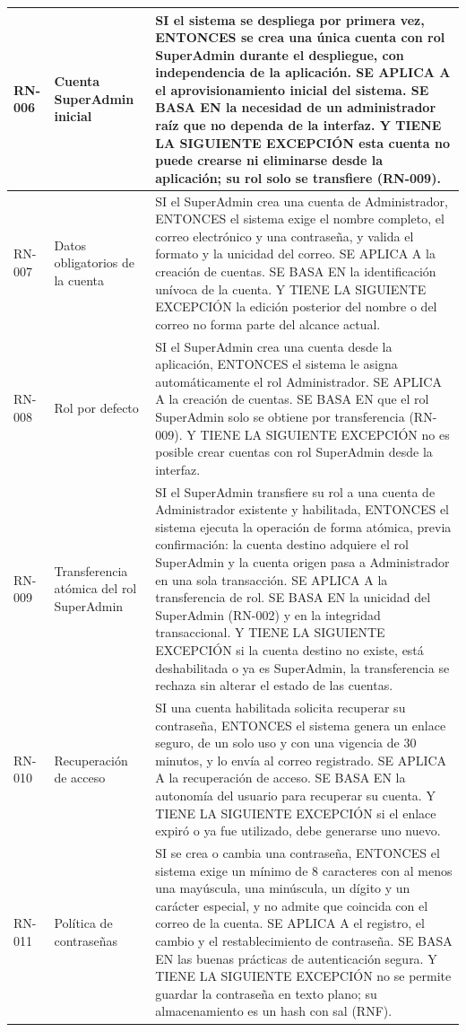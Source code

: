 \begin{longtable}{|C{1.4cm}|L{4.0cm}|L{9.4cm}|}
\hline
RN-006 & Cuenta SuperAdmin inicial & SI el sistema se despliega por primera vez, ENTONCES se crea una única cuenta con rol SuperAdmin durante el despliegue, con independencia de la aplicación. SE APLICA A el aprovisionamiento inicial del sistema. SE BASA EN la necesidad de un administrador raíz que no dependa de la interfaz. Y TIENE LA SIGUIENTE EXCEPCIÓN esta cuenta no puede crearse ni eliminarse desde la aplicación; su rol solo se transfiere (RN-009). \\
\hline
RN-007 & Datos obligatorios de la cuenta & SI el SuperAdmin crea una cuenta de Administrador, ENTONCES el sistema exige el nombre completo, el correo electrónico y una contraseña, y valida el formato y la unicidad del correo. SE APLICA A la creación de cuentas. SE BASA EN la identificación unívoca de la cuenta. Y TIENE LA SIGUIENTE EXCEPCIÓN la edición posterior del nombre o del correo no forma parte del alcance actual. \\
\hline
RN-008 & Rol por defecto & SI el SuperAdmin crea una cuenta desde la aplicación, ENTONCES el sistema le asigna automáticamente el rol Administrador. SE APLICA A la creación de cuentas. SE BASA EN que el rol SuperAdmin solo se obtiene por transferencia (RN-009). Y TIENE LA SIGUIENTE EXCEPCIÓN no es posible crear cuentas con rol SuperAdmin desde la interfaz. \\
\hline
RN-009 & Transferencia atómica del rol SuperAdmin & SI el SuperAdmin transfiere su rol a una cuenta de Administrador existente y habilitada, ENTONCES el sistema ejecuta la operación de forma atómica, previa confirmación: la cuenta destino adquiere el rol SuperAdmin y la cuenta origen pasa a Administrador en una sola transacción. SE APLICA A la transferencia de rol. SE BASA EN la unicidad del SuperAdmin (RN-002) y en la integridad transaccional. Y TIENE LA SIGUIENTE EXCEPCIÓN si la cuenta destino no existe, está deshabilitada o ya es SuperAdmin, la transferencia se rechaza sin alterar el estado de las cuentas. \\
\hline
RN-010 & Recuperación de acceso & SI una cuenta habilitada solicita recuperar su contraseña, ENTONCES el sistema genera un enlace seguro, de un solo uso y con una vigencia de 30 minutos, y lo envía al correo registrado. SE APLICA A la recuperación de acceso. SE BASA EN la autonomía del usuario para recuperar su cuenta. Y TIENE LA SIGUIENTE EXCEPCIÓN si el enlace expiró o ya fue utilizado, debe generarse uno nuevo. \\
\hline
RN-011 & Política de contraseñas & SI se crea o cambia una contraseña, ENTONCES el sistema exige un mínimo de 8 caracteres con al menos una mayúscula, una minúscula, un dígito y un carácter especial, y no admite que coincida con el correo de la cuenta. SE APLICA A el registro, el cambio y el restablecimiento de contraseña. SE BASA EN las buenas prácticas de autenticación segura. Y TIENE LA SIGUIENTE EXCEPCIÓN no se permite guardar la contraseña en texto plano; su almacenamiento es un hash con sal (RNF). \\

\end{longtable}
